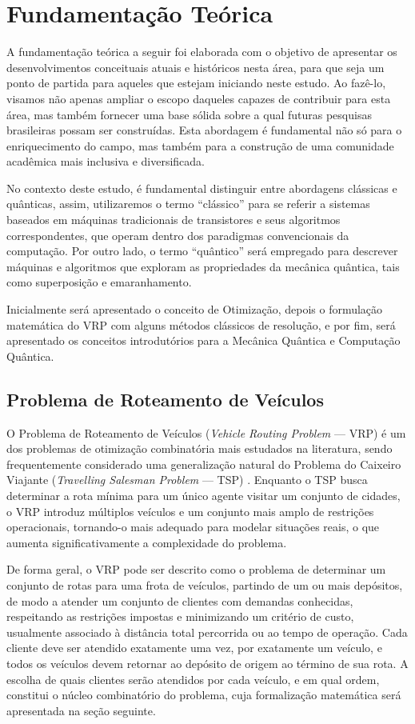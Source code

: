 \chapter{Fundamentação Teórica}

A fundamentação teórica a seguir foi elaborada com o objetivo de apresentar os desenvolvimentos conceituais atuais e históricos nesta área, para que seja um ponto de partida para aqueles que estejam iniciando neste estudo. Ao fazê-lo, visamos não apenas ampliar o escopo daqueles capazes de contribuir para esta área, mas também fornecer uma base sólida sobre a qual futuras pesquisas brasileiras possam ser construídas. Esta abordagem é fundamental não só para o enriquecimento do campo, mas também para a construção de uma comunidade acadêmica mais inclusiva e diversificada.

No contexto deste estudo, é fundamental distinguir entre abordagens clássicas e quânticas, assim, utilizaremos o termo ``clássico'' para se referir a sistemas baseados em máquinas tradicionais de transistores e seus algoritmos correspondentes, que operam dentro dos paradigmas convencionais da computação. Por outro lado, o termo ``quântico'' será empregado para descrever máquinas e algoritmos que exploram as propriedades da mecânica quântica, tais como superposição e emaranhamento.

Inicialmente será apresentado o conceito de Otimização, depois o formulação matemática do VRP com alguns métodos clássicos de resolução, e por fim, será apresentado os conceitos introdutórios para a Mecânica Quântica e Computação Quântica.

\section{Problema de Roteamento de Veículos}

O Problema de Roteamento de Veículos (\textit{Vehicle Routing Problem} — VRP) é um dos problemas de otimização combinatória mais estudados na literatura, sendo frequentemente considerado uma generalização natural do Problema do Caixeiro Viajante (\textit{Travelling Salesman Problem} — TSP) \cite{gavish1978travelling}. Enquanto o TSP busca determinar a rota mínima para um único agente visitar um conjunto de cidades, o VRP introduz múltiplos veículos e um conjunto mais amplo de restrições operacionais, tornando-o mais adequado para modelar situações reais, o que aumenta significativamente a complexidade do problema.

De forma geral, o VRP pode ser descrito como o problema de determinar um conjunto de rotas para uma frota de veículos, partindo de um ou mais depósitos, de modo a atender um conjunto de clientes com demandas conhecidas, respeitando as restrições impostas e minimizando um critério de custo, usualmente associado à distância total percorrida ou ao tempo de operação. Cada cliente deve ser atendido exatamente uma vez, por exatamente um veículo, e todos os veículos devem retornar ao depósito de origem ao término de sua rota. A escolha de quais clientes serão atendidos por cada veículo, e em qual ordem, constitui o núcleo combinatório do problema, cuja formalização matemática será apresentada na seção seguinte.

